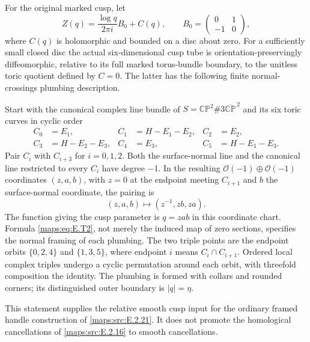 

For the original marked cusp, let
\[
 Z(q)=\frac{\log q}{2\pi i}B_0+C(q),\qquad
 B_0=\begin{pmatrix}0&1\\-1&0\end{pmatrix},
\]
where $C(q)$ is holomorphic and bounded on a disc about zero.
For a sufficiently small closed disc the actual six-dimensional
cusp tube is orientation-preservingly diffeomorphic, relative to
its full marked torus-bundle boundary, to the unitless toric
quotient defined by $C=0$.  The latter has the following finite
normal-crossings plumbing description.

Start with the canonical complex line bundle of
$S=\mathbb {CP}^2\#3\overline{\mathbb {CP}}^{\,2}$ and its six
toric curves in cyclic order
\[
 \begin{aligned}
 C_0&=E_1,& C_1&=H-E_1-E_2,& C_2&=E_2,\\
 C_3&=H-E_2-E_3,& C_4&=E_3,& C_5&=H-E_1-E_3.
 \end{aligned}
 \tag{E.T1}\label{maps:eq:E.T1}
\]
Pair $C_i$ with $C_{i+3}$ for $i=0,1,2$.  Both the surface-normal
line and the canonical line restricted to every $C_i$ have degree
$-1$.  In the resulting $\mathcal O(-1)\oplus\mathcal O(-1)$
coordinates $(z,a,b)$, with $z=0$ at the endpoint meeting
$C_{i+1}$ and $b$ the surface-normal coordinate, the pairing is
\[
             (z,a,b)\longmapsto(z^{-1},zb,za).
 \tag{E.T2}\label{maps:eq:E.T2}
\]
The function giving the cusp parameter is $q=zab$ in this
coordinate chart.  Formula \eqref{maps:eq:E.T2}, not merely the induced map
of zero sections, specifies the normal framing of each plumbing.
The two triple points are the endpoint orbits
$\{0,2,4\}$ and $\{1,3,5\}$, where endpoint $i$ means
$C_i\cap C_{i+1}$.  Ordered local complex triples undergo a
cyclic permutation around each orbit, with threefold composition
the identity.  The plumbing is formed with collars and rounded
corners; its distinguished outer boundary is $|q|=\eta$.

This statement supplies the relative smooth cusp input for the
ordinary framed handle construction of \ref{maps:src:E.2.21}.  It does not
promote the homological cancellations of \ref{maps:src:E.2.16} to smooth
cancellations.

